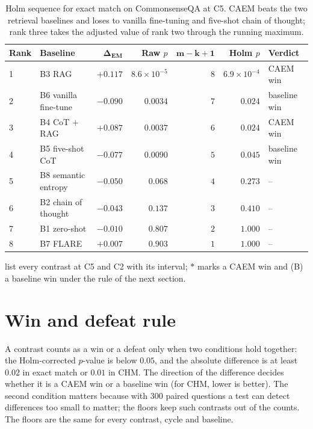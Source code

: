 \begin{table}[H]
\centering\footnotesize
\setlength{\tabcolsep}{4pt}
\begin{tabular}{@{}llrrrrl@{}}
\toprule
\textbf{Rank} & \textbf{Baseline} & $\boldsymbol{\Delta_{\text{EM}}}$ & \textbf{Raw $p$} & $\boldsymbol{m-k+1}$ & \textbf{Holm $p$} & \textbf{Verdict} \\
\midrule
1 & B3 RAG & $+0.117$ & $8.6 \times 10^{-5}$ & $8$ & $6.9 \times 10^{-4}$ & CAEM win \\
2 & B6 vanilla fine-tune & $-0.090$ & $0.0034$ & $7$ & $0.024$ & baseline win \\
3 & B4 CoT $+$ RAG & $+0.087$ & $0.0037$ & $6$ & $0.024$ & CAEM win \\
4 & B5 five-shot CoT & $-0.077$ & $0.0090$ & $5$ & $0.045$ & baseline win \\
5 & B8 semantic entropy & $-0.050$ & $0.068$ & $4$ & $0.273$ & -- \\
6 & B2 chain of thought & $-0.043$ & $0.137$ & $3$ & $0.410$ & -- \\
7 & B1 zero-shot & $-0.010$ & $0.807$ & $2$ & $1.000$ & -- \\
8 & B7 FLARE & $+0.007$ & $0.903$ & $1$ & $1.000$ & -- \\
\bottomrule
\end{tabular}
\caption[Holm sequence on CommonsenseQA at C5.]{Holm sequence for exact match on CommonsenseQA at C5. CAEM beats the two retrieval baselines and loses to vanilla fine-tuning and five-shot chain of thought; rank three takes the adjusted value of rank two through the running maximum.}
\label{tab:app-sig-holm-fever}
\end{table}

 list every contrast at C5 and C2 with its interval; $\ast$ marks a CAEM win and (B) a baseline win under the rule of the next section.





\section{Win and defeat rule}
\label{app:sig-licensing}

A contrast counts as a win or a defeat only when two conditions hold together: the Holm-corrected $p$-value is below $0.05$, and the absolute difference is at least $0.02$ in exact match or $0.01$ in CHM. The direction of the difference decides whether it is a CAEM win or a baseline win (for CHM, lower is better). The second condition matters because with $300$ paired questions a test can detect differences too small to matter; the floors keep such contrasts out of the counts. The floors are the same for every contrast, cycle and baseline.

